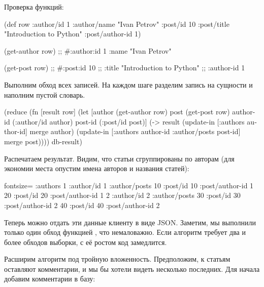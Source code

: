 Проверка функций:

\begin{english}
  \begin{clojure}
(def row
  {:author/id 1
   :author/name "Ivan Petrov"
   :post/id 10
   :post/title "Introduction to Python"
   :post/author-id 1})

(get-author row)
;; #:author{:id 1 :name "Ivan Petrov"}

(get-post row)
;; #:post{:id 10
;;        :title "Introduction to Python"
;;        :author-id 1}
  \end{clojure}
\end{english}

Выполним обход всех записей. На каждом шаге разделим запись на сущности и наполним пустой словарь.

\begin{english}
  \begin{clojure}
(reduce
 (fn [result row]
   (let [author    (get-author row)
         post      (get-post row)
         author-id (:author/id author)
         post-id   (:post/id post)]
     (-> result
         (update-in [:authors author-id]
                    merge author)
         (update-in [:authors author-id
                     :author/posts post-id]
                    merge post))))
 {}
 db-result)
  \end{clojure}
\end{english}

Распечатаем результат. Видим, что статьи сгруппированы по авторам (для экономии места опустим имена авторов и названия статей):

\begin{english}
  \begin{clojure*}{fontsize=\small}
{:authors
 {1 {:author/id 1
     :author/posts
     {10 {:post/id 10
          :post/author-id 1}
      20 {:post/id 20
          :post/author-id 1}}}
  2 {:author/id 2
     :author/posts
     {30 {:post/id 30
          :post/author-id 2}
      40 {:post/id 40
          :post/author-id 2}}}}}
  \end{clojure*}
\end{english}


Теперь можно отдать эти данные клиенту в виде JSON. Заметим, мы выполнили только один обход функцией , что немаловажно. Если алгоритм требует два и более обходов выборки, с её ростом код замедлится.

Расширим алгоритм под тройную вложенность. Предположим, к статьям оставляют комментарии, и мы бы хотели видеть не\-сколь\-ко последних. Для начала добавим комментарии в базу:


